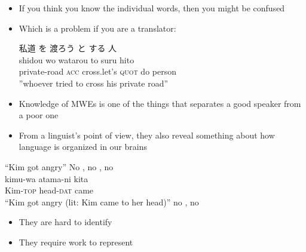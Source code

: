 \documentclass[a4paper,landscape,headrule,footrule,xetex]{foils}
\begin{document}

\begin{itemize}
\item If you think you know the individual words, then you might be  confused

\item  Which is a problem if you are a translator:
\\  
\begin{exe}
  \ex \glll 私道 を 渡ろう と する 人 \\
  shidou wo watarou to suru hito \\
  private-road \textsc{acc} cross.let's \textsc{quot} do person \\
\trans ''whoever tried to cross his private road''
\end{exe}
\item Knowledge of MWEs is one of the things that separates a good speaker from a poor one
\item From a linguist's point of view, they also reveal something about
  how language is organized in our brains
\end{itemize}




\begin{exe}
  \ex {}
  \trans ``Kim got angry''
  \trans No , no , no 
  \ex  \glll {}    \\
  kimu-wa atama-ni  kita \\
  Kim-\textsc{top} head-\textsc{dat} came \\
  \trans ``Kim got angry (lit: Kim came to her head)''
  \trans no , no 
\end{exe}

\begin{itemize}
\item They are hard to identify
\item They require work to represent
\end{itemize}
\end{document}
